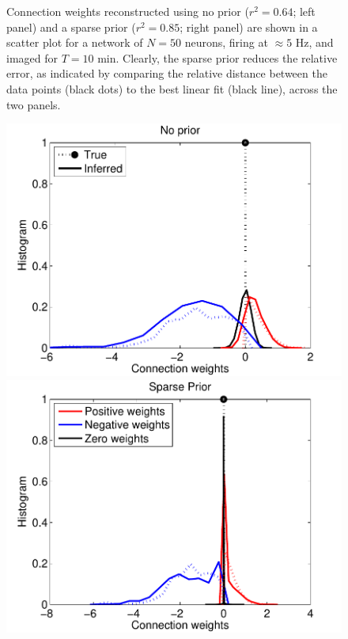 \documentclass[aoas,preprint]{imsart}
\begin{document}
\begin{figure}[h]
\begin{minipage}[c]{0.45\hsize}
\end{minipage}
\caption{Connection weights reconstructed using no prior ($r^2=0.64$; left panel) and a sparse prior ($r^2=0.85$; right panel) are shown in a scatter plot for a network of $N=50$ neurons, firing at $\approx 5$ Hz, and imaged for $T=10$ min. Clearly, the sparse prior reduces the relative error, as indicated by comparing the relative distance between the data points (black dots) to the best linear fit (black line), across the two panels.  }
\label{fig:sparse}
\end{figure}

\begin{figure}[h]
\centering
\begin{minipage}[c]{0.45\hsize}
\includegraphics[width=\hsize]{../figs/FigureA3_hist_glm200}
\end{minipage}
\begin{minipage}[c]{0.45\hsize}
\includegraphics[width=\hsize]{../figs/FigureA3_hist_spa200}

\end{minipage}
\end{figure}
\end{document}
